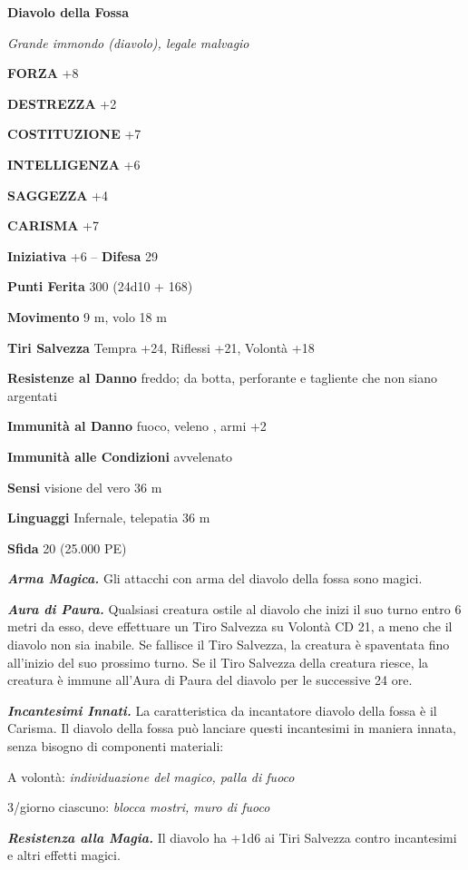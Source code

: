 \begin{multicols}{2}
\medskip{}\textbf{Diavolo della Fossa}

\emph{Grande immondo (diavolo), legale malvagio}

\textbf{FORZA} +8

\textbf{DESTREZZA} +2

\textbf{COSTITUZIONE} +7

\textbf{INTELLIGENZA} +6

\textbf{SAGGEZZA} +4

\textbf{CARISMA} +7

\textbf{Iniziativa} +6 -- \textbf{Difesa} 29

\textbf{Punti Ferita} 300 (24d10 + 168) 

\textbf{Movimento} 9 m, volo 18 m

\textbf{Tiri Salvezza} Tempra +24, Riflessi +21, Volontà +18

\textbf{Resistenze al Danno} freddo; da botta, perforante e tagliente che non siano argentati

\textbf{Immunità al Danno} fuoco, veleno , armi +2

\textbf{Immunità alle Condizioni} avvelenato

\textbf{Sensi} visione del vero 36 m

\textbf{Linguaggi} Infernale, telepatia 36 m

\textbf{Sfida} 20 (25.000 PE)

\emph{\textbf{Arma Magica.}} Gli attacchi con arma del diavolo della fossa sono magici.

\emph{\textbf{Aura di Paura.}} Qualsiasi creatura ostile al diavolo che inizi il suo turno entro 6 metri da esso, deve effettuare un Tiro Salvezza su Volontà CD 21, a meno che il diavolo non sia inabile. Se fallisce il Tiro Salvezza, la creatura è spaventata fino all'inizio del suo prossimo turno. Se il Tiro Salvezza della creatura riesce, la creatura è immune all'Aura di Paura del diavolo per le successive 24 ore.

\emph{\textbf{Incantesimi Innati.}} La caratteristica da incantatore  diavolo della fossa è il Carisma. Il diavolo della fossa può lanciare questi incantesimi in maniera innata, senza bisogno di componenti materiali:

A volontà: \emph{individuazione del magico, palla di fuoco}

3/giorno ciascuno: \emph{blocca mostri, muro di fuoco}

\emph{\textbf{Resistenza alla Magia.}} Il diavolo ha +1d6 ai Tiri Salvezza contro incantesimi e altri effetti magici.


\end{multicols}
